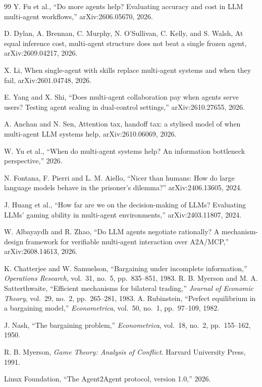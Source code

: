 \documentclass[11pt]{article}
\begin{document}
\begin{thebibliography}{99}
 Y. Fu et al., ``Do more agents help? Evaluating accuracy and cost in LLM multi-agent workflows,'' arXiv:2606.05670, 2026.

 D. Dylan, A. Brennan, C. Murphy, N. O'Sullivan, C. Kelly, and S. Walsh, At equal inference cost, multi-agent structure does not beat a single frozen agent, arXiv:2609.04217, 2026.

 X. Li, When single-agent with skills replace multi-agent systems and when they fail, arXiv:2601.04748, 2026.

 E. Yang and X. Shi, ``Does multi-agent collaboration pay when agents serve users? Testing agent scaling in dual-control settings,'' arXiv:2610.27655, 2026.

 A. Anchan and N. Sen, Attention tax, handoff tax: a stylised model of when multi-agent LLM systems help, arXiv:2610.06069, 2026.

 W. Yu et al., ``When do multi-agent systems help? An information bottleneck perspective,'' 2026.

 N. Fontana, F. Pierri and L. M. Aiello, ``Nicer than humans: How do large language models behave in the prisoner's dilemma?'' arXiv:2406.13605, 2024.

 J. Huang et al., ``How far are we on the decision-making of LLMs? Evaluating LLMs' gaming ability in multi-agent environments,'' arXiv:2403.11807, 2024.

 W. Albayaydh and R. Zhao, ``Do LLM agents negotiate rationally? A mechanism-design framework for verifiable multi-agent interaction over A2A/MCP,'' arXiv:2608.14613, 2026.

 K. Chatterjee and W. Samuelson, ``Bargaining under incomplete information,'' \emph{Operations Research}, vol.~31, no.~5, pp.~835--851, 1983.
 R. B. Myerson and M. A. Satterthwaite, ``Efficient mechanisms for bilateral trading,'' \emph{Journal of Economic Theory}, vol.~29, no.~2, pp.~265--281, 1983.
 A. Rubinstein, ``Perfect equilibrium in a bargaining model,'' \emph{Econometrica}, vol.~50, no.~1, pp.~97--109, 1982.

 J. Nash, ``The bargaining problem,'' \emph{Econometrica}, vol.~18, no.~2, pp.~155--162, 1950.

 R. B. Myerson, \emph{Game Theory: Analysis of Conflict}. Harvard University Press, 1991.

 Linux Foundation, ``The Agent2Agent protocol, version 1.0,'' 2026.

\end{thebibliography}
\end{document}
